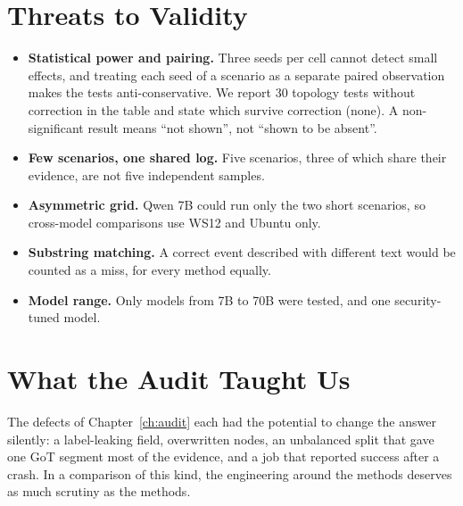 \section{Threats to Validity}
\begin{itemize}
\item \textbf{Statistical power and pairing.} Three seeds per cell cannot detect small effects, and treating each seed of a scenario as a separate paired observation makes the tests anti-conservative. We report 30 topology tests without correction in the table and state which survive correction (none). A non-significant result means ``not shown'', not ``shown to be absent''.
\item \textbf{Few scenarios, one shared log.} Five scenarios, three of which share their evidence, are not five independent samples.
\item \textbf{Asymmetric grid.} Qwen 7B could run only the two short scenarios, so cross-model comparisons use WS12 and Ubuntu only.
\item \textbf{Substring matching.} A correct event described with different text would be counted as a miss, for every method equally.
\item \textbf{Model range.} Only models from 7B to 70B were tested, and one security-tuned model.
\end{itemize}

\section{What the Audit Taught Us}
The defects of Chapter~\ref{ch:audit} each had the potential to change the answer silently: a label-leaking field, overwritten nodes, an unbalanced split that gave one GoT segment most of the evidence, and a job that reported success after a crash. In a comparison of this kind, the engineering around the methods deserves as much scrutiny as the methods.
